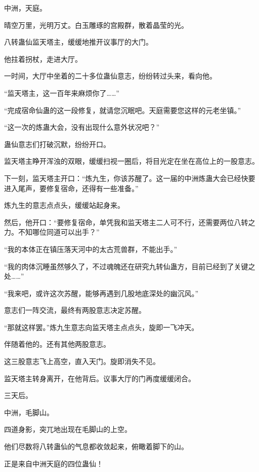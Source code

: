
\begin{this_body}

中洲，天庭。

晴空万里，光明万丈。白玉雕琢的宫殿群，散着晶莹的光。

八转蛊仙监天塔主，缓缓地推开议事厅的大门。

他拄着拐杖，走进大厅。

一时间，大厅中坐着的二十多位蛊仙意志，纷纷转过头来，看向他。

“监天塔主，这一百年来麻烦你了……”

“完成宿命仙蛊的这一段修复，就请您沉眠吧。天庭需要您这样的元老坐镇。”

“这一次的炼蛊大会，没有出现什么意外状况吧？”

蛊仙意志们打破沉默，纷纷开口。

监天塔主睁开浑浊的双眼，缓缓扫视一圈后，将目光定在坐在高位上的一股意志。

下一刻，监天塔主开口：“炼九生，你该苏醒了。这一届的中洲炼蛊大会已经快要进入尾声，要修复宿命，还得有一些准备。”

炼九生的意志点点头，缓缓站起身来。

然后，他开口：“要修复宿命，单凭我和监天塔主二人可不行，还需要两位八转之力。不知哪位同道可以出手？”

“我的本体正在镇压落天河中的太古荒兽群，不能出手。”

“我的肉体沉睡虽然够久了，不过魂魄还在研究九转仙蛊方，目前已经到了关键之处……”

“我来吧，或许这次苏醒，能够再遇到几股地底深处的幽沉风。”

意志们一阵交流，最终有两股意志决定苏醒。

“那就这样罢。”炼九生意志向监天塔主点点头，旋即一飞冲天。

伴随着他的。还有其他两股意志。

这三股意志飞上高空，直入天门。旋即消失不见。

监天塔主转身离开，在他背后。议事大厅的门再度缓缓闭合。

三天后。

中洲，毛脚山。

四道身影，突兀地出现在毛脚山的上空。

他们尽数将八转蛊仙的气息都收敛起来，俯瞰着脚下的山。

正是来自中洲天庭的四位蛊仙！


\end{this_body}
